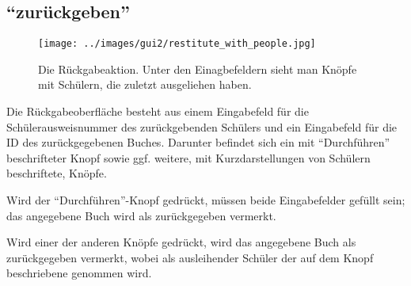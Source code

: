\subsection{``zurückgeben''}
\label{subsec:detail:restitute}
\begin{figure}\texttt{[image: ../images/gui2/restitute\_with\_people.jpg]}\caption{Die Rückgabeaktion. Unter den Einagbefeldern sieht man Knöpfe mit Schülern, die zuletzt ausgeliehen haben.}\label{fig:restitute_with_people}\end{figure}


Die Rückgabeoberfläche besteht aus einem Eingabefeld für die Schülerausweisnummer des zurückgebenden Schülers und ein Eingabefeld für die ID des zurückgegebenen Buches. Darunter befindet sich ein mit ``Durchführen'' beschrifteter Knopf sowie ggf. weitere, mit Kurzdarstellungen von Schülern beschriftete, Knöpfe.

Wird der ``Durchführen''-Knopf gedrückt, müssen beide Eingabefelder gefüllt sein; das angegebene Buch wird als zurückgegeben vermerkt.

Wird einer der anderen Knöpfe gedrückt, wird das angegebene Buch als zurückgegeben vermerkt, wobei als ausleihender Schüler der auf dem Knopf beschriebene genommen wird.


